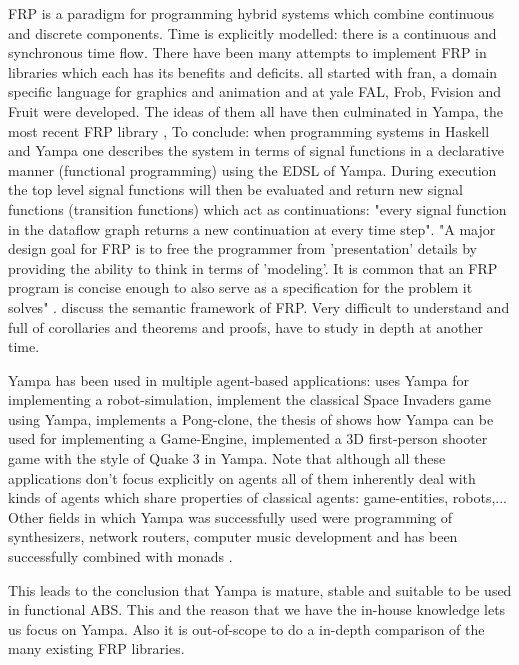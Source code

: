 FRP is a paradigm for programming hybrid systems which combine continuous and discrete components. Time is explicitly modelled: there is a continuous and synchronous time flow. There have been many attempts to implement FRP in libraries which each has its benefits and deficits. all started with fran, a domain specific language for graphics and animation and at yale FAL, Frob, Fvision and Fruit were developed. The ideas of them all have then culminated in Yampa, the most recent FRP library \cite{nilsson_functional_2002}, 
To conclude: when programming systems in Haskell and Yampa one describes the system in terms of signal functions in a declarative manner (functional programming) using the EDSL of Yampa. During execution the top level signal functions will then be evaluated and return new signal functions (transition functions) which act as continuations: "every signal function in the dataflow graph returns a new continuation at every time step".
"A major design goal for FRP is to free the programmer from 'presentation' details by providing the ability to think in terms of 'modeling'. It is common that an FRP program is concise enough to also serve as a specification for the problem it solves" \cite{Wan2000}. \cite{Wan2000} discuss the semantic framework of FRP. Very difficult to understand and full of corollaries and theorems and proofs, have to study in depth at another time.

Yampa has been used in multiple agent-based applications: \cite{hudak_arrows_2003} uses Yampa for implementing a robot-simulation, \cite{courtney_yampa_2003} implement the classical Space Invaders game using Yampa, \cite{nilsson_declarative_2014} implements a Pong-clone, the thesis of \cite{meisinger_game-engine-architektur_2010} shows how Yampa can be used for implementing a Game-Engine, \cite{mun_hon_functional_2005} implemented a 3D first-person shooter game with the style of Quake 3 in Yampa. Note that although all these applications don't focus explicitly on agents all of them inherently deal with kinds of agents which share properties of classical agents: game-entities, robots,... Other fields in which Yampa was successfully used were programming of synthesizers, network routers, computer music development and has been successfully combined with monads \cite{perez_functional_2016}.

This leads to the conclusion that Yampa is mature, stable and suitable to be used in functional ABS. This and the reason that we have the in-house knowledge lets us focus on Yampa. Also it is out-of-scope to do a in-depth comparison of the many existing FRP libraries.

